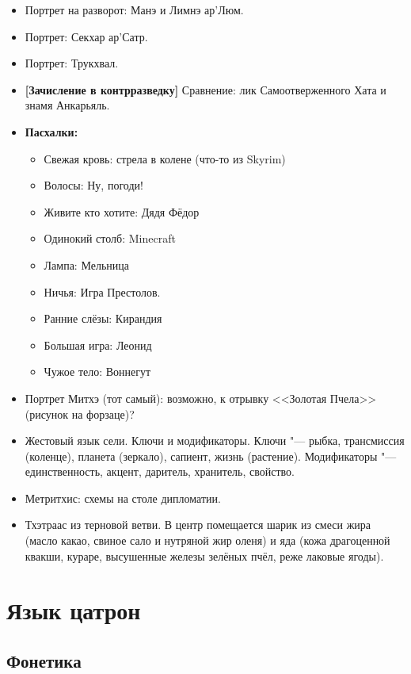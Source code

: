 \begin{itemize}
\item Портрет на разворот: Манэ и Лимнэ ар'Люм.
\item Портрет: Секхар ар'Сатр.
\item Портрет: Трукхвал.
\item \textbf{[Зачисление в контрразведку]} Сравнение: лик Самоотверженного Хата и знамя Анкарьяль.
\item \textbf{Пасхалки:}
\begin{itemize}
\item Свежая кровь: стрела в колене (что-то из Skyrim)
\item Волосы: Ну, погоди!
\item Живите кто хотите: Дядя Фёдор
\item Одинокий столб: Minecraft
\item Лампа: Мельница
\item Ничья: Игра Престолов.
\item Ранние слёзы: Кирандия
\item Большая игра: Леонид
\item Чужое тело: Воннегут
\end{itemize}
\item Портрет Митхэ (тот самый): возможно, к отрывку <<Золотая Пчела>> (рисунок на форзаце)?
\item Жестовый язык сели.
Ключи и модификаторы.
Ключи "--- рыбка, трансмиссия (коленце), планета (зеркало), сапиент, жизнь (растение).
Модификаторы "--- единственность, акцент, даритель, хранитель, свойство.
\item Метритхис: схемы на столе дипломатии.
\item Тхэтраас из терновой ветви. 
В центр помещается шарик из смеси жира (масло какао, свиное сало и нутряной жир оленя) и яда (кожа драгоценной квакши, кураре, высушенные железы зелёных пчёл, реже лаковые ягоды).
\end{itemize}

\section{Язык цатрон}

\subsection{Фонетика}

